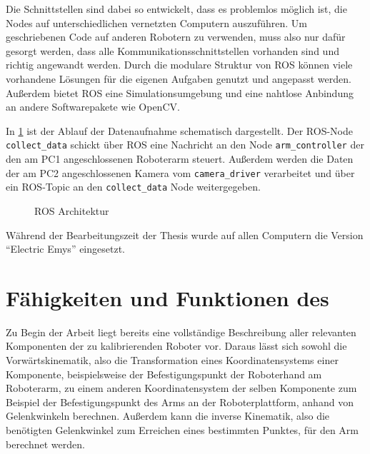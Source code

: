 Die Schnittstellen sind dabei so entwickelt, dass es problemlos möglich ist, die
Nodes auf unterschiedlichen vernetzten Computern auszuführen.  Um geschriebenen
Code auf anderen Robotern zu verwenden, muss also nur dafür gesorgt werden, dass
alle Kommunikationsschnittstellen vorhanden sind und richtig angewandt werden.
Durch die modulare Struktur von \ac{ROS} können viele vorhandene Lösungen für
die eigenen Aufgaben genutzt und angepasst werden.  Außerdem bietet \ac{ROS}
eine Simulationsumgebung und eine nahtlose Anbindung an andere Softwarepakete
wie OpenCV.

In \ref{fig:ros} ist der Ablauf der Datenaufnahme schematisch dargestellt. Der
\ac{ROS}-Node \allowbreak \texttt{collect\_data} schickt über \ac{ROS} eine Nachricht
an den Node \texttt{arm\_controller} der den am PC1 angeschlossenen 
Roboterarm steuert. Außerdem werden die Daten der am PC2 angeschlossenen Kamera
vom \texttt{camera\_driver} verarbeitet und über ein \ac{ROS}-Topic an den 
\texttt{collect\_data} Node weitergegeben.

\begin{figure}[Htbp]


\label{fig:ros}
\caption{\ac{ROS} Architektur}


\end{figure}


Während der Bearbeitungszeit der Thesis wurde auf allen Computern die Version
``Electric Emys'' eingesetzt.

\section{Fähigkeiten und Funktionen des \protect\cob} %

\label{sec:Fähigkeiten und Funktionen des cob}

Zu Begin der Arbeit liegt bereits eine vollständige Beschreibung aller
relevanten Komponenten der zu kalibrierenden Roboter vor. Daraus lässt sich
sowohl die Vorwärtskinematik, also die Transformation eines Koordinatensystems
einer Komponente, beispielsweise der Befestigungspunkt der Roboterhand am
Roboterarm, zu einem anderen Koordinatensystem der selben Komponente zum
Beispiel der Befestigungspunkt des Arms an der Roboterplattform, anhand von
Gelenkwinkeln berechnen. Außerdem kann die inverse Kinematik, also die
benötigten Gelenkwinkel zum Erreichen eines bestimmten Punktes, für den Arm
berechnet werden.


